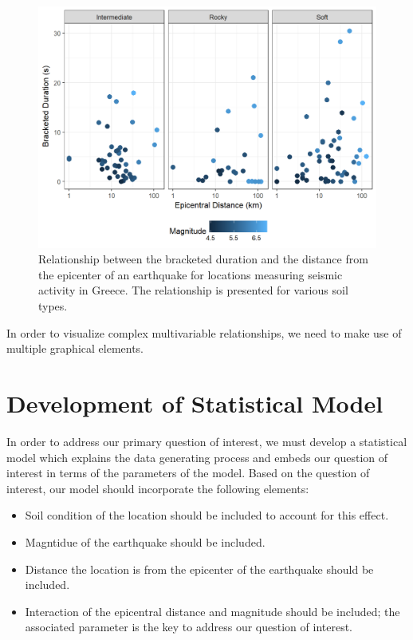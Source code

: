 \documentclass[]{book}
\providecommand{\tightlist}{%
  \setlength{\itemsep}{0pt}\setlength{\parskip}{0pt}}
\theoremstyle{definition}
\theoremstyle{definition}
\theoremstyle{definition}
\theoremstyle{remark}
\begin{document}
\begin{figure}

{\centering \includegraphics[width=0.8\linewidth]{./Images/regrecap-plot-1} 

}

\caption{Relationship between the bracketed duration and the distance from the epicenter of an earthquake for locations measuring seismic activity in Greece.  The relationship is presented for various soil types.}\label{fig:regrecap-plot}
\end{figure}

In order to visualize complex multivariable relationships, we need to
make use of multiple graphical elements.

\section{Development of Statistical
Model}\label{development-of-statistical-model}

In order to address our primary question of interest, we must develop a
statistical model which explains the data generating process and embeds
our question of interest in terms of the parameters of the model. Based
on the question of interest, our model should incorporate the following
elements:

\begin{itemize}
\tightlist
\item
  Soil condition of the location should be included to account for this
  effect.
\item
  Magntidue of the earthquake should be included.
\item
  Distance the location is from the epicenter of the earthquake should
  be included.
\item
  Interaction of the epicentral distance and magnitude should be
  included; the associated parameter is the key to address our question
  of interest.
\end{itemize}
\end{document}
